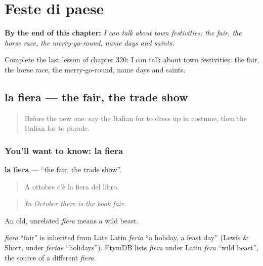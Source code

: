 
\chapter{Feste di paese}
\label{ch:it-feste-di-paese}

\begin{chapteropening}
\textbf{By the end of this chapter:} \emph{I can talk about town festivities: the fair, the horse race, the merry-go-round, name days and saints.}

Complete the last lesson of chapter 320: I can talk about town festivities: the fair, the horse race, the merry-go-round, name days and saints.
\end{chapteropening}

\section[la fiera]{la fiera — the fair, the trade show}

\label{lesson:IT-C320-fiera}



\begin{quote}
Before the new one: say the Italian for to dress up in costume, then the Italian for to parade.
\end{quote}

\subsection*{You'll want to know: la fiera}
\textbf{la fiera} — \textquotedblleft{}the fair, the trade show\textquotedblright{}.

\begin{quote}
A ottobre c'è la fiera del libro.
\end{quote}

\begin{quote}
\emph{In October there is the book fair.}
\end{quote}

An old, unrelated \emph{fiera} means a wild beast.

\begin{cousinweb}
\emph{fiera} \textquotedblleft{}fair\textquotedblright{} is inherited from Late Latin \emph{fēria} \textquotedblleft{}a holiday, a feast day\textquotedblright{} (Lewis \& Short, under \emph{fēriae} \textquotedblleft{}holidays\textquotedblright{}). EtymDB lists \emph{fiera} under Latin \emph{fera} \textquotedblleft{}wild beast\textquotedblright{}, the source of a different \emph{fiera}.
\end{cousinweb}

